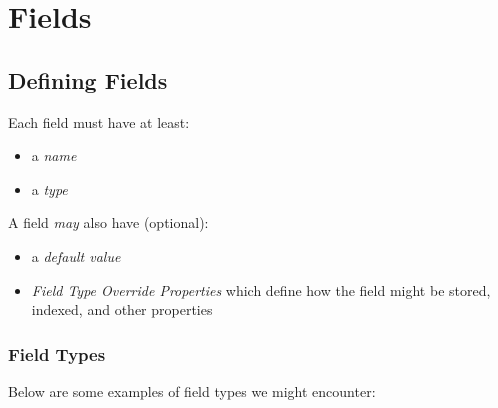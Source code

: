 \bigskip


\section{Fields}

\subsection{Defining Fields} \label{defining-fields}

Each field must have at least:
\begin{itemize}
	\item a \emph{name}
	\item a \emph{type}
\end{itemize}


A field \emph{may} also have (optional):
\begin{itemize}
	\item a \emph{default value}
	
	\item \emph{Field Type Override Properties} which define how the field might be stored, indexed, and other properties
\end{itemize}


\subsubsection*{Field Types}

Below are some examples of field types we might encounter:

